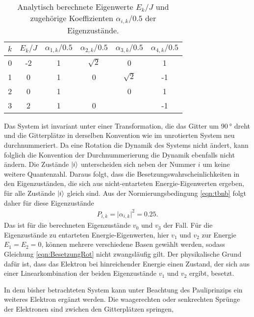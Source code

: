 \begin{table}[h]
  \centering
  \caption{Analytisch berechnete Eigenwerte $E_k/J$ und zugehörige Koeffizienten $\alpha_{i,k}/0.5$ der Eigenzustände.}
  \begin{tabular}{S[table-format=1.0] S[table-format=2.0] S[table-format=1.0] S[table-format=1.0] S[table-format=1.0] S[table-format=2.0]}
    \toprule
    {$k$} & {$E_k/J$} & {$\alpha_{1,k}/0.5$} & {$\alpha_{2,k}/0.5$} & {$\alpha_{3,k}/0.5$} & {$\alpha_{4,k}/0.5$}\\
     & -2 & 1 & $\sqrt{2}$         & 0           & 1  \\
    1 & 0  & 1 & 0                  & $\sqrt{2}$  & -1 \\
    2 & 0  & 1 &  & 0           & 1  \\
    3 & 2  & 1 & 0                  &  & -1 \\
    \bottomrule
  \end{tabular}
  \label{tab:tbeigene1}
\end{table}

Das System ist invariant unter einer Transformation, die das Gitter um $\SI{90}{\degree}$ dreht und die Gitterplätze in derselben Konvention wie im unrotierten System neu durchnummeriert.
Da eine Rotation die Dynamik des Systems nicht ändert, kann folglich die Konvention der Durchnummerierung die Dynamik ebenfalls nicht ändern.
Die Zustände $\ket{i}$ unterscheiden sich neben der Nummer $i$ um keine weitere Quantenzahl. Daraus folgt, dass die Besetzungswahrscheinlichkeiten in den
Eigenzuständen, die sich aus nicht-entarteten Energie-Eigenwerten ergeben, für alle Zustände $\ket{i}$ gleich sind.
Aus der Normierungsbedingung \eqref{eqn:tbnb} folgt daher für diese Eigenzustände
\begin{align}
  P_{i,k} = \lvert \alpha_{i,k} \rvert^2 = 0.25.
  \label{eqn:BesetzungRot}
\end{align}
Das ist für die berechneten Eigenzustände $v_0$ und $v_3$ der Fall. Für die Eigenzustände zu entarteten Energie-Eigenwerten, hier $v_1$ und $v_2$ zur Energie $E_1 = E_2 = 0$, können mehrere verschiedene Basen
gewählt werden, sodass Gleichung \eqref{eqn:BesetzungRot} nicht zwangsläufig gilt. Der physikalische Grund dafür ist, dass das Elektron bei hinreichender Energie einen Zustand,
der sich aus einer Linearkombination der beiden Eigenzustände $v_1$ und $v_2$ ergibt, besetzt.

In dem bisher betrachteten System kann unter Beachtung des Pauliprinzips ein weiteres Elektron ergänzt werden.
Die waagerechten oder senkrechten Sprünge der Elektronen sind  zwichen den Gitterplätzen springen,




